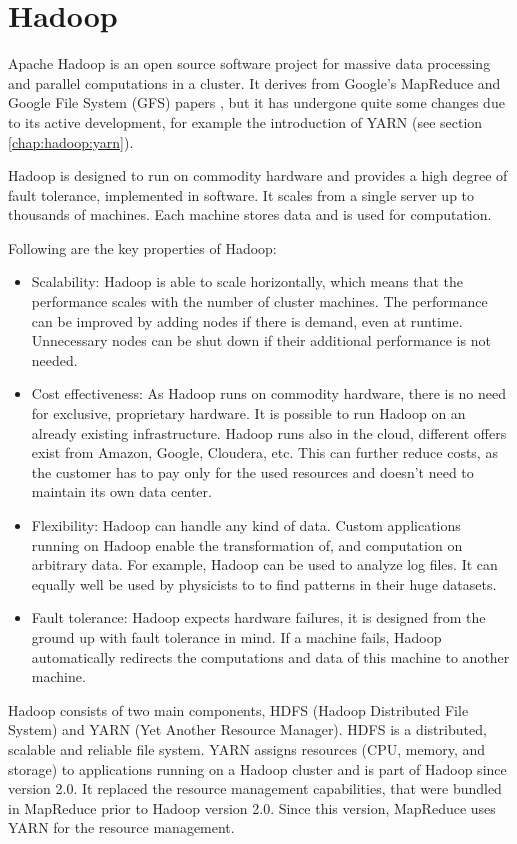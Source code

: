 \chapter{Hadoop}
\label{chap:hadoop}
Apache Hadoop \cite{hadoop} is an open source software project for massive data processing and parallel computations in a cluster. It derives from Google's MapReduce \cite{dean2008mapreduce} and Google File System (GFS) papers \cite{ghemawat2003google}, but it has undergone quite some changes due to its active development, for example the introduction of YARN (see section \ref{chap:hadoop:yarn}).

Hadoop is designed to run on commodity hardware and provides a high degree of fault tolerance, implemented in software. It scales from a single server up to thousands of machines. Each machine stores data and is used for computation.

Following are the key properties of Hadoop:
\begin{itemize}
  \item Scalability: Hadoop is able to scale horizontally, which means that the performance scales with the number of cluster machines. The performance can be improved by adding nodes if there is demand, even at runtime. Unnecessary nodes can be shut down if their additional performance is not needed.
  \item Cost effectiveness: As Hadoop runs on commodity hardware, there is no need for exclusive, proprietary hardware. It is possible to run Hadoop on an already existing infrastructure. Hadoop runs also in the cloud, different offers exist from Amazon, Google, Cloudera, etc. This can further reduce costs, as the customer has to pay only for the used resources and doesn't need to maintain its own data center.
  \item Flexibility: Hadoop can handle any kind of data. Custom applications running on Hadoop enable the transformation of, and computation on arbitrary data. For example, Hadoop can be used to analyze log files. It can equally well be used by physicists to to find patterns in their huge datasets.
  \item Fault tolerance: Hadoop expects hardware failures, it is designed from the ground up with fault tolerance in mind. If a machine fails, Hadoop automatically redirects the computations and data of this machine to another machine.
\end{itemize}

Hadoop consists of two main components, HDFS (Hadoop Distributed File System) and YARN (Yet Another Resource Manager). HDFS is a distributed, scalable and reliable file system. YARN assigns resources (CPU, memory, and storage) to applications running on a Hadoop cluster and is part of Hadoop since version 2.0. It replaced the resource management capabilities, that were bundled in MapReduce prior to Hadoop version 2.0. Since this version, MapReduce uses YARN for the resource management.


